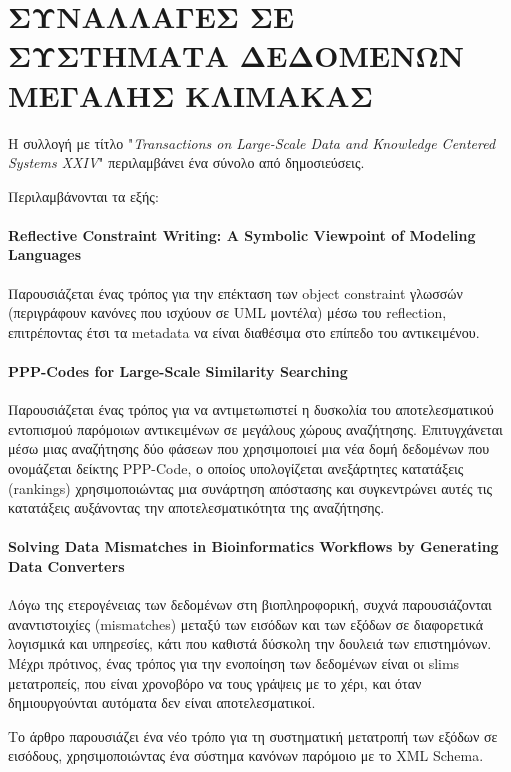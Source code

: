 \section{ΣΥΝΑΛΛΑΓΕΣ ΣΕ ΣΥΣΤΗΜΑΤΑ ΔΕΔΟΜΕΝΩΝ ΜΕΓΑΛΗΣ ΚΛΙΜΑΚΑΣ}
    Η συλλογή με τίτλο "\textit{Transactions on Large-Scale Data and Knowledge Centered Systems XXIV}" περιλαμβάνει ένα σύνολο από δημοσιεύσεις. \cite{TransactionsonLargeScale}

    Περιλαμβάνονται τα εξής:
    \paragraph{Reflective Constraint Writing: A Symbolic Viewpoint of Modeling Languages}
        Παρουσιάζεται ένας τρόπος για την επέκταση των object constraint γλωσσών (περιγράφουν κανόνες που ισχύουν σε UML μοντέλα) μέσω του reflection, επιτρέποντας έτσι τα metadata να είναι διαθέσιμα στο επίπεδο του αντικειμένου.

    \paragraph{PPP-Codes for Large-Scale Similarity Searching}
        Παρουσιάζεται ένας τρόπος για να αντιμετωπιστεί η δυσκολία του αποτελεσματικού εντοπισμού παρόμοιων αντικειμένων σε μεγάλους χώρους αναζήτησης.
        Επιτυγχάνεται μέσω μιας αναζήτησης δύο φάσεων που χρησιμοποιεί μια νέα δομή δεδομένων που ονομάζεται δείκτης PPP-Code, ο οποίος υπολογίζεται ανεξάρτητες κατατάξεις (rankings) χρησιμοποιώντας μια συνάρτηση απόστασης και συγκεντρώνει αυτές τις κατατάξεις αυξάνοντας την αποτελεσματικότητα της αναζήτησης.

    \paragraph{Solving Data Mismatches in Bioinformatics Workflows by Generating Data Converters}
        Λόγω της ετερογένειας των δεδομένων στη βιοπληροφορική, συχνά παρουσιάζονται αναντιστοιχίες (mismatches) μεταξύ των εισόδων και των εξόδων σε διαφορετικά λογισμικά και υπηρεσίες, κάτι που καθιστά δύσκολη την δουλειά των επιστημόνων.
        Μέχρι πρότινος, ένας τρόπος για την ενοποίηση των δεδομένων είναι οι slims μετατροπείς, που είναι χρονοβόρο να τους γράψεις με το χέρι, και όταν δημιουργούνται αυτόματα δεν είναι αποτελεσματικοί.

        Το άρθρο παρουσιάζει ένα νέο τρόπο για τη συστηματική μετατροπή των εξόδων σε εισόδους, χρησιμοποιώντας ένα σύστημα κανόνων παρόμοιο με το XML Schema.


